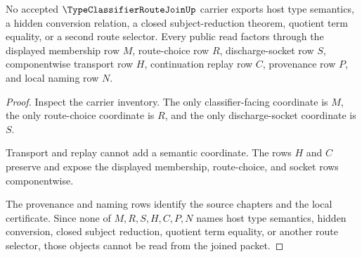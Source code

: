 \begin{theorem}
\label{thm:type-classifier-route-join-nonescape}
No accepted $\TypeClassifierRouteJoinUp$ carrier exports host type semantics, a hidden conversion relation, a closed subject-reduction theorem, quotient term equality, or a second route selector. Every public read factors through the displayed membership row $M$, route-choice row $R$, discharge-socket row $S$, componentwise transport row $H$, continuation replay row $C$, provenance row $P$, and local naming row $N$.
\end{theorem}
\begin{proof}
Inspect the carrier inventory. The only classifier-facing coordinate is $M$, the only route-choice coordinate is $R$, and the only discharge-socket coordinate is $S$.

Transport and replay cannot add a semantic coordinate. The rows $H$ and $C$ preserve and expose the displayed membership, route-choice, and socket rows componentwise.

The provenance and naming rows identify the source chapters and the local certificate. Since none of $M,R,S,H,C,P,N$ names host type semantics, hidden conversion, closed subject reduction, quotient term equality, or another route selector, those objects cannot be read from the joined packet.
\end{proof}


\begin{closurestatus}{\TypeClassifierRouteJoinUp}
  \theoryclosure{\seedClosure}
  \formalstatus{\unformalizedV}
\end{closurestatus}
